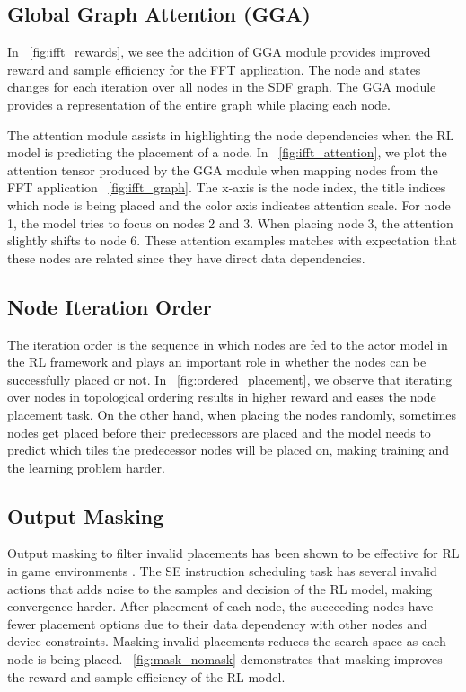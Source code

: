 \subsection{Global Graph Attention (GGA)} \label{sec:GGA_result}

In \figurename~\ref{fig:ifft_rewards}, we see the addition of GGA module provides improved reward and sample efficiency for the FFT application. 
The node and states changes for each iteration over all nodes in the SDF graph. The GGA module provides a representation of the entire graph while placing each node.

The attention module assists in highlighting the node dependencies when the RL model is predicting the placement of a node. 
In \figurename~\ref{fig:ifft_attention}, we plot the attention tensor produced by the GGA module when mapping nodes from the FFT application \figurename~\ref{fig:ifft_graph}. 
The x-axis is the node index, the title indices which node is being placed and the color axis indicates attention scale.
For node 1, the model tries to focus on nodes 2 and 3. When placing node 3, the attention slightly shifts to node 6. 
These attention examples matches with expectation that these nodes are related since they have direct data dependencies. 

\subsection{Node Iteration Order}

The iteration order is the sequence in which nodes are fed to the actor model in the RL framework and plays an important role in whether the nodes can be successfully placed or not. 
In \figurename~\ref{fig:ordered_placement}, we observe that iterating over nodes in topological ordering results in higher reward and eases the node placement task. 
On the other hand, when placing the nodes randomly, sometimes nodes get placed before their predecessors are placed and the model needs to predict which tiles the predecessor nodes will be placed on, making training and the learning problem harder.

\subsection{Output Masking}
\label{subsec:output_masking}
Output masking to filter invalid placements has been shown to be effective for RL in game environments \cite{Shengyi_mask}. 
The SE instruction scheduling task has several invalid actions that adds noise to the samples and decision of the RL model, making convergence harder. 
After placement of each node, the succeeding nodes have fewer placement options due to their data dependency with other nodes and device constraints.
Masking invalid placements reduces the search space as each node is being placed. 
\figurename~\ref{fig:mask_nomask} demonstrates that masking improves the reward and sample efficiency of the RL model.

